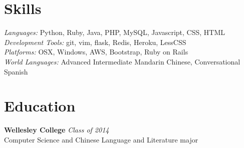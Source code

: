 \documentclass[margin,line]{resume}
\begin{document}
\begin{resume}
\section{\mysidestyle Skills}

\textsl{Languages:} Python, Ruby, Java, PHP, MySQL, Javascript, CSS, HTML\vspace{1mm}\\%
\textsl{Development Tools:} git, vim, flask, Redis, Heroku, LessCSS\vspace{1mm}\\%
\textsl{Platforms:} OSX, Windows, AWS, Bootstrap, Ruby on Rails\vspace{1mm}\\%
\textsl{World Languages:} Advanced Intermediate Mandarin Chinese, Conversational Spanish\vspace{-4mm}\\%
\section{\mysidestyle Education}

\textbf{Wellesley College} \hfill \textsl{Class of 2014}\vspace{0mm}\\%
Computer Science and Chinese Language and Literature major
\end{resume}
\end{document}
